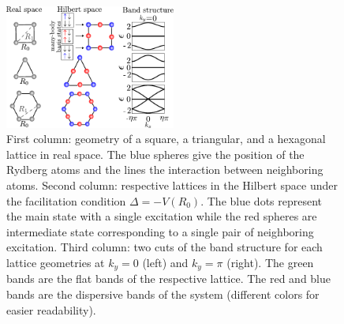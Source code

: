 \documentclass[prl,aps,twocolumn,showpacs,superscriptaddress,longbibliography]{revtex4-1}
\begin{document}
\begin{figure}
% 	    

	      \includegraphics[width=0.5\textwidth]{graphics/lattices_real_hilbert_bands.pdf}

		\caption{
		    First column: geometry of a square, a triangular, and a hexagonal lattice 
		    in real space. The blue spheres give the position of the Rydberg atoms and
		    the lines the interaction between neighboring atoms. Second column: respective lattices in {\color{red} the Hilbert space under
		    the facilitation condition $\Delta = -V(R_0)$.} The blue dots represent the main state with a single excitation while the red spheres
		    are intermediate state corresponding to a single pair of neighboring excitation.
		    Third column: two cuts of the band structure for each lattice geometries at $k_y= 0$ (left) and $k_y = \pi$ (right).
		    The green bands are the flat bands of the respective lattice. The red and blue bands are the dispersive bands of the system
		    (different colors for easier readability).
                    }
  
	\label{Fig:flat_band_lattices}
\end{figure} 
\end{document}
